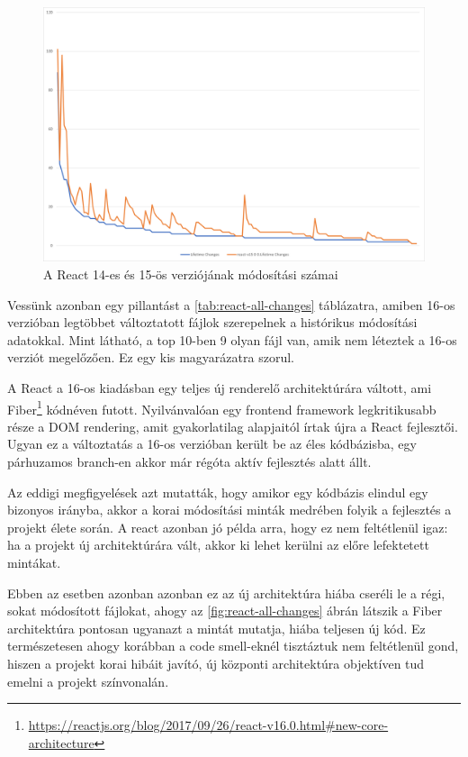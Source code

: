 \begin{figure}[H]
    \centering
    \includegraphics[width=1\textwidth]{images/react/react-14-15-changes.png}
    \caption{A React 14-es és 15-ös verziójának módosítási számai}
    \label{fig:react-14-15-changes}
\end{figure}

Vessünk azonban egy pillantást a \ref{tab:react-all-changes} táblázatra, amiben 16-os verzióban legtöbbet változtatott fájlok szerepelnek a histórikus módosítási adatokkal. Mint látható, a top 10-ben 9 olyan fájl van, amik nem léteztek a 16-os verziót megelőzően. Ez egy kis magyarázatra szorul.

A React a 16-os kiadásban egy teljes új renderelő architektúrára váltott, ami Fiber\footnote{\url{https://reactjs.org/blog/2017/09/26/react-v16.0.html\#new-core-architecture}} kódnéven futott. Nyilvánvalóan egy frontend framework legkritikusabb része a DOM rendering, amit gyakorlatilag alapjaitól írtak újra a React fejlesztői. Ugyan ez a változtatás a 16-os verzióban került be az éles kódbázisba, egy párhuzamos branch-en akkor már régóta aktív fejlesztés alatt állt.

Az eddigi megfigyelések azt mutatták, hogy amikor egy kódbázis elindul egy bizonyos irányba, akkor a korai módosítási minták medrében folyik a fejlesztés a projekt élete során. A react azonban jó példa arra, hogy ez nem feltétlenül igaz: ha a projekt új architektúrára vált, akkor ki lehet kerülni az előre lefektetett mintákat.

Ebben az esetben azonban azonban ez az új architektúra hiába cseréli le a régi, sokat módosított fájlokat, ahogy az \ref{fig:react-all-changes} ábrán látszik a Fiber architektúra pontosan ugyanazt a mintát mutatja, hiába teljesen új kód. Ez természetesen ahogy korábban a code smell-eknél tisztáztuk nem feltétlenül gond, hiszen a projekt korai hibáit javító, új központi architektúra objektíven tud emelni a projekt színvonalán.


